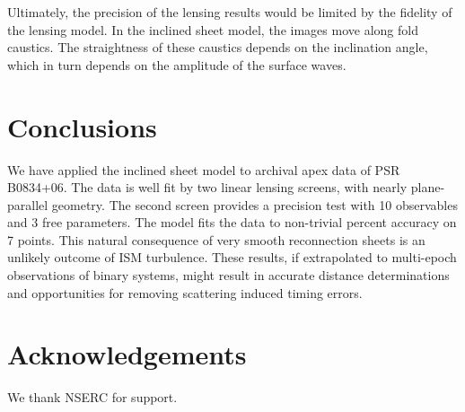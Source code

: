 \documentclass[useAMS,usenatbib]{mn2e}
\begin{document}
Ultimately, the precision of the lensing results would be limited by
the fidelity of the lensing model.  In the inclined sheet model, the
images move along fold caustics.  The straightness of these caustics
depends on the inclination angle, which in turn depends on the
amplitude of the surface waves.  

\section{Conclusions}

We have applied the \citep{2014MNRAS.442.3338P} inclined
sheet model to archival apex data of PSR B0834+06.  The data is well
fit by two linear lensing screens, with nearly plane-parallel
geometry.  The second screen provides a precision test with 10
observables and 3 free parameters.  The model fits the data to 
non-trivial percent accuracy on 7 points.
This natural consequence of very smooth
reconnection sheets is an unlikely outcome of ISM turbulence.
These results, if extrapolated to multi-epoch observations of binary
systems, might result in accurate distance determinations and
opportunities for removing scattering induced timing errors.


\section{Acknowledgements}

We thank NSERC for support.


\newcommand{\araa}{ARA\&A}   %
\newcommand{\afz}{Afz}       %
\newcommand{\aj}{AJ}         %
\newcommand{\azh}{AZh}       %
\newcommand{\aaa}{A\&A}      %
\newcommand{\aas}{A\&AS}     %
\newcommand{\aar}{A\&AR}     %
\newcommand{\apj}{ApJ}       %
\newcommand{\apjs}{ApJS}     %
\newcommand{\apjl}{ApJ}      %
\newcommand{\apss}{Ap\&SS}   %
\newcommand{\baas}{BAAS}     %
\newcommand{\jaa}{JA\&A}     %
\newcommand{\mnras}{MNRAS}   %
\newcommand{\nat}{Nat}       %
\newcommand{\pasj}{PASJ}     %
\newcommand{\pasp}{PASP}     %
\newcommand{\paspc}{PASPC}   %
\newcommand{\qjras}{QJRAS}   %
\newcommand{\sci}{Sci}       %
\newcommand{\solphys}{Solar Physics}       %
\newcommand{\sova}{SvA}      %
\newcommand{\aap}{A\&A}
\newcommand\jcap{{J. Cosmology Astropart. Phys.}}%
\newcommand{\prd}{Phys. Rev. D}






\label{lastpage}
\end{document}
